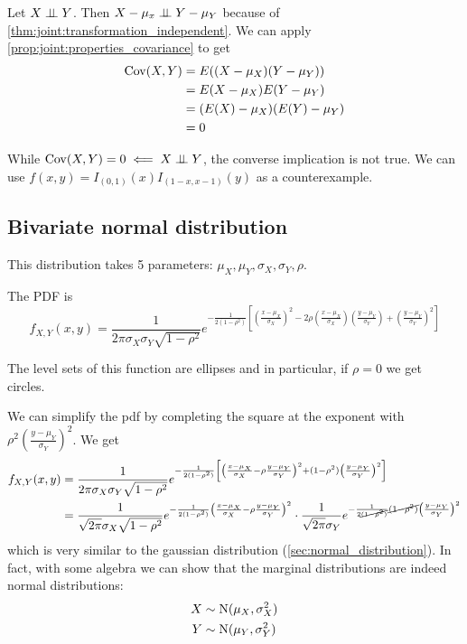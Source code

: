 \documentclass[14pt]{extarticle}
\newcommand{\cov}{{\operatorfont Cov}}
\newcommand{\Normal}{{\operatorfont N}}
\begin{document}
\begin{proposition}
    Let $X \perp \!\!\! \perp Y$. Then $X - \mu_x \perp \!\!\! \perp Y -\mu_Y$ because of \autoref{thm:joint:transformation_independent}.
    We can apply \autoref{prop:joint:properties_covariance} to get
    \begin{align}
        \cov(X, Y) & = E((X - \mu_X)(Y - \mu_Y))    \\
                   & = E(X - \mu_X) E(Y - \mu_Y)    \\
                   & = (E(X) - \mu_X)(E(Y) - \mu_Y) \\
                   & = 0
    \end{align}
\end{proposition}

\begin{remark}
    While $\cov(X, Y) = 0 \impliedby X \indep Y$, the converse implication is not true.
    We can use $f(x, y) = I_{(0,1)}(x) I_{(1-x, x-1)}(y)$ as a counterexample.
\end{remark}

\subsection{Bivariate normal distribution}

This distribution takes 5 parameters: $\mu_X, \mu_Y, \sigma_X, \sigma_Y, \rho$.

The PDF is
\begin{equation}
    f_{X,Y}(x,y) = \frac{1}{2 \pi \sigma_X \sigma_Y \sqrt{1- \rho^2}} e^{-\frac{1}{2(1-\rho^2)} \left[ \left( \frac{x - \mu_X}{\sigma_X} \right)^2 -2 \rho \left( \frac{x-\mu_X}{\sigma_X} \right) \left( \frac{y-\mu_Y}{\sigma_Y} \right) + \left(\frac{y-\mu_Y}{\sigma_Y}\right)^2 \right]}
\end{equation}

The level sets of this function are ellipses and in particular, if $\rho = 0$ we get circles.

We can simplify the pdf by completing the square at the exponent with $\rho ^2 \left(\frac{y - \mu_Y}{\sigma_Y}\right)^2$. We get
\begin{align}
    f_{X,Y}(x,y) & = \frac{1}{2 \pi \sigma_X \sigma_Y \sqrt{1- \rho^2}} e^{-\frac{1}{2(1-\rho^2)} \left[ \left( \frac{x - \mu_X}{\sigma_X} - \rho \frac{y-\mu_Y}{\sigma_Y} \right)^2 + (1 - \rho^2) \left(\frac{y-\mu_Y}{\sigma_Y}\right)^2 \right]} \\
                 & = \frac{1}{\sqrt{2 \pi} \sigma_X \sqrt{1- \rho^2}} e^{-\frac{1}{2(1-\rho^2)} \left( \frac{x - \mu_X}{\sigma_X} - \rho \frac{y-\mu_Y}{\sigma_Y} \right)^2} \cdot
    \frac{1}{\sqrt{2 \pi} \sigma_Y} e^{-\frac{1}{2\cancel{(1-\rho^2)}} \cancel{(1 - \rho^2)} \left(\frac{y-\mu_Y}{\sigma_Y}\right)^2}
\end{align}
which is very similar to the gaussian distribution (\autoref{sec:normal_distribution}).
In fact, with some algebra we can show that the marginal distributions are indeed normal distributions:
\begin{align}
    X & \sim \Normal(\mu_X, \sigma_X^2) \\
    Y & \sim \Normal(\mu_Y, \sigma_Y^2)
\end{align}
\end{document}
